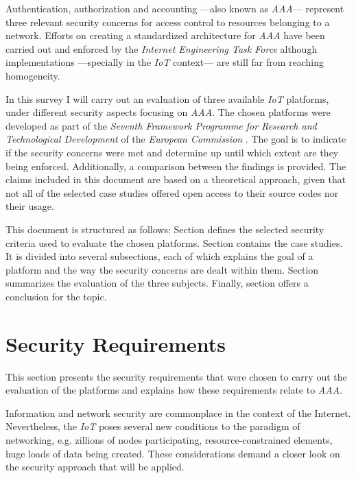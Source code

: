 \documentclass[journal]{IEEEtran}
\begin{document}
  Authentication, authorization and accounting ---also known as \emph{AAA}--- represent three relevant security concerns for access control to resources belonging to a network. Efforts on creating a standardized architecture for \emph{AAA} have been carried out and enforced by the \emph{Internet Engineering Task Force} \cite{RFC2903, RFC2904} although implementations ---specially in the \emph{IoT} context--- are still far from reaching homogeneity.
   
  In this survey I will carry out an evaluation of three available \emph{IoT} platforms, under different security aspects focusing on \emph{AAA}. The chosen platforms were developed as part of the \emph{Seventh Framework Programme for Research and Technological Development} of the \emph{European Commission} \cite{FP7}. The goal is to indicate if the security concerns were met and determine up until which extent are they being enforced. Additionally, a comparison between the findings is provided. The claims included in this document are based on a theoretical approach, given that not all of the selected case studies offered open access to their source codes nor their usage.

  This document is structured as follows: Section \uppercase\expandafter{} defines the selected security criteria used to evaluate the chosen platforms. Section \uppercase\expandafter{} contains the case studies. It is divided into several subsections, each of which explains the goal of a platform and the way the security concerns are dealt within them. Section \uppercase\expandafter{} summarizes the evaluation of the three subjects. Finally, section \uppercase\expandafter{} offers a conclusion for the topic.

\section{Security Requirements} \label{sec_security_requirements}
  This section presents the security requirements that were chosen to carry out the evaluation of the platforms and explains how these requirements relate to \emph{AAA}.

  Information and network security are commonplace in the context of the Internet. Nevertheless, the \emph{IoT} poses several new conditions to the paradigm of networking, e.g. zillions of nodes participating, resource-constrained elements, huge loads of data being created. These considerations demand a closer look on the security approach that will be applied.
\end{document}
